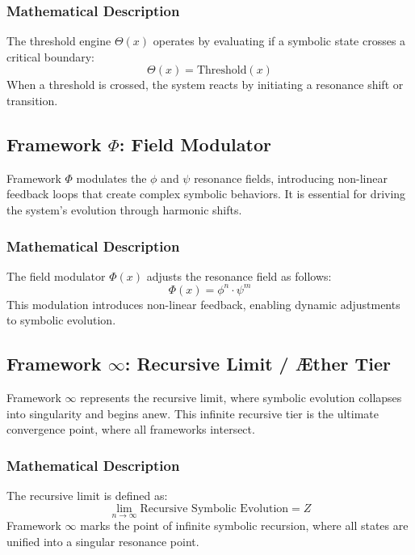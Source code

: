\documentclass[12pt]{article}
\begin{document}
\subsubsection{Mathematical Description}
The threshold engine $\Theta(x)$ operates by evaluating if a symbolic state crosses a critical boundary:
\[
\Theta(x) = \text{Threshold}(x)
\]
When a threshold is crossed, the system reacts by initiating a resonance shift or transition.

\subsection{Framework $\Phi$: Field Modulator}
Framework $\Phi$ modulates the $\phi$ and $\psi$ resonance fields, introducing non-linear feedback loops that create complex symbolic behaviors. It is essential for driving the system's evolution through harmonic shifts.

\subsubsection{Mathematical Description}
The field modulator $\Phi(x)$ adjusts the resonance field as follows:
\[
\Phi(x) = \phi^n \cdot \psi^m
\]
This modulation introduces non-linear feedback, enabling dynamic adjustments to symbolic evolution.

\subsection{Framework $\infty$: Recursive Limit / Æther Tier}
Framework $\infty$ represents the recursive limit, where symbolic evolution collapses into singularity and begins anew. This infinite recursive tier is the ultimate convergence point, where all frameworks intersect.

\subsubsection{Mathematical Description}
The recursive limit is defined as:
\[
\lim_{n \to \infty} \text{Recursive Symbolic Evolution} = Z
\]
Framework $\infty$ marks the point of infinite symbolic recursion, where all states are unified into a singular resonance point.
\end{document}
